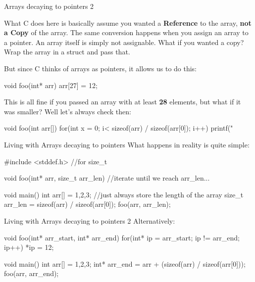 \documentclass[10pt,graphics,aspectratio=169,table]{beamer}
\begin{document}
\begin{frame}[fragile]{Arrays decaying to pointers 2}
   
    
    What C does here is basically assume you wanted a \textbf{Reference} to 
    the array,  \textbf{not a Copy} of the array. The same conversion happens
    when you assign an array to a pointer. An array itself is simply not
    assignable. What if you wanted a copy? 
    Wrap the array in a struct and pass that. 

    But since C thinks of arrays as pointers, it allows us to do this:
    \begin{codeblock}
void foo(int* arr){
    arr[27] = 12;
}
    \end{codeblock} 

    This is all fine if you passed an array with at least \textbf{28}
    elements, but what if it was smaller? Well let's always check then:
\begin{codeblock}
void foo(int arr[]){ 
   for(int x = 0; i< sizeof(arr) / sizeof(arr[0]); i++){
       printf("%
   }
}
\end{codeblock} 
\end{frame}

\begin{frame}[fragile]{Living with Arrays decaying to pointers}
What happens in reality is quite simple:
\begin{codeblock} 
#include <stddef.h> //for size_t

void foo(int* arr, size_t arr_len){ 
    //iterate until we reach arr_len...
}

void main(){
    int arr[] = {1,2,3};
    //just always store the length of the array
    size_t arr_len = sizeof(arr) / sizeof(arr[0]); 
    foo(arr, arr_len);
}
\end{codeblock} 
\end{frame}

\begin{frame}[fragile]{Living with Arrays decaying to pointers 2}
    Alternatively:
    \begin{codeblock} 
void foo(int* arr_start, int* arr_end){ 
    for(int* ip = arr_start; ip != arr_end; ip++){
        *ip = 12;
    }
}

void main(){
    int arr[] = {1,2,3};
    int* arr_end = arr + (sizeof(arr) / sizeof(arr[0]));
    foo(arr, arr_end);
}
    \end{codeblock} 

\end{frame}
\end{document}
